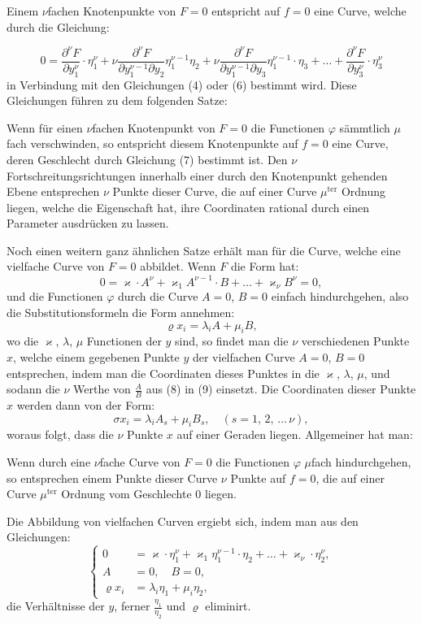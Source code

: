 \documentclass{article}
\begin{document}
Einem $\nu$fachen Knotenpunkte von $F = 0$ entspricht auf $f = 0$ eine Curve, welche durch die Gleichung:

\[
0 = \frac{\partial^\nu F}{\partial y_1^\nu} \cdot \eta_1^\nu + \nu \frac{\partial^\nu F}{\partial y_1^{\nu-1} \partial y_2} \eta_1^{\nu-1} \eta_2 + \nu \frac{\partial^\nu F}{\partial y_1^{\nu-1} \partial y_3} \eta_1^{\nu-1} \cdot \eta_3 + \dots + \frac{\partial^\nu F}{\partial y_3^\nu} \cdot \eta_3^\nu \tag{7}
\]
in Verbindung mit den Gleichungen (4) oder (6) bestimmt wird. Diese Gleichungen führen zu dem folgenden Satze:

Wenn für einen $\nu$fachen Knotenpunkt von $F = 0$ die Functionen $\varphi$ sämmtlich $\mu$fach verschwinden, so entspricht diesem Knotenpunkte auf $f = 0$ eine Curve, deren Geschlecht durch Gleichung (7) bestimmt ist. Den $\nu$ Fortschreitungsrichtungen innerhalb einer durch den Knotenpunkt gehenden Ebene entsprechen $\nu$ Punkte dieser Curve, die auf einer Curve $\mu^{\text{ter}}$ Ordnung liegen, welche die Eigenschaft hat, ihre Coordinaten rational durch einen Parameter ausdrücken zu lassen.

Noch einen weitern ganz ähnlichen Satze erhält man für die Curve, welche eine vielfache Curve von $F = 0$ abbildet. Wenn $F$ die Form hat:
\[
0 = \varkappa \cdot A^\nu + \varkappa_1 A^{\nu-1} \cdot B + \dots + \varkappa_\nu B^\nu = 0, \tag{8}
\]
und die Functionen $\varphi$ durch die Curve $A = 0$, $B = 0$ einfach hindurchgehen, also die Substitutionsformeln die Form annehmen:
\[
\varrho x_i = \lambda_i A + \mu_i B, \tag{9}
\]
wo die $\varkappa$, $\lambda$, $\mu$ Functionen der $y$ sind, so findet man die $\nu$ verschiedenen Punkte $x$, welche einem gegebenen Punkte $y$ der vielfachen Curve $A = 0$, $B = 0$ entsprechen, indem man die Coordinaten dieses Punktes in die $\varkappa$, $\lambda$, $\mu$, und sodann die $\nu$ Werthe von $\frac{A}{B}$ aus (8) in (9) einsetzt. Die Coordinaten dieser Punkte $x$ werden dann von der Form:
\[
\sigma x_i = \lambda_i A_s + \mu_i B_s, \quad (s = 1,\, 2,\, \dots\, \nu),
\]
woraus folgt, dass die $\nu$ Punkte $x$ auf einer Geraden liegen. Allgemeiner hat man:

Wenn durch eine $\nu$fache Curve von $F = 0$ die Functionen $\varphi$ $\mu$fach hindurchgehen, so entsprechen einem Punkte dieser Curve $\nu$ Punkte auf $f = 0$, die auf einer Curve $\mu^{\text{ter}}$ Ordnung vom Geschlechte $0$ liegen.

Die Abbildung von vielfachen Curven ergiebt sich, indem man aus den Gleichungen:
\[
\left\{
\begin{aligned}
0 &= \varkappa \cdot \eta_1^\nu + \varkappa_1 \eta_1^{\nu-1} \cdot \eta_2 + \dots + \varkappa_\nu \cdot \eta_2^\nu, \\
A &= 0, \quad B = 0, \\
\varrho x_i &= \lambda_i \eta_1 + \mu_i \eta_2,
\end{aligned}
\right.
\]
die Verhältnisse der $y$, ferner $\frac{\eta_1}{\eta_2}$ und $\varrho$ eliminirt.
\end{document}
